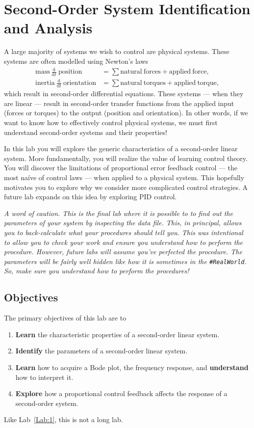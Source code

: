 \chapter{Second-Order System Identification and Analysis}\label{Lab:2}
A large majority of systems we wish to control are physical systems. These
systems are often modelled using Newton's laws
\[
\begin{aligned}
  \mathrm{mass}~\frac{\mathrm d}{\mathrm{d}t}~\mathrm{position}
    &= \sum \mathrm{natural~forces} + \mathrm{applied~force},\\
  \mathrm{inertia}~\frac{\mathrm d}{\mathrm{d}t}~\mathrm{orientation}
    &= \sum \mathrm{natural~torques} + \mathrm{applied~torque},
\end{aligned}
\]
which result in second-order differential equations. These systems --- when
they are linear --- result in second-order transfer functions from the
applied input (forces or torques) to the output (position and orientation).
In other words, if we want to know how to effectively control physical systems,
we must first understand second-order systems and their properties!

In this lab you will explore the generic characteristics of a second-order
linear system. More fundamentally, you will realize the value of learning
control theory. You will discover the limitations of proportional error
feedback control --- the most na\'ive of control laws --- when applied to
a physical system. This hopefully motivates you to explore why we consider
more complicated control strategies. A future lab expands on this
idea by exploring PID control.

\emph{A word of caution. This is the final lab where it is possible to
to find out the parameters of your system by inspecting the data file.
This, in principal, allows you to back-calculate what your procedures should
tell you. This was intentional to allow
you to check your work and ensure you understand how to perform the procedure.
However, future labs will assume you've perfected the procedure.
The parameters will be fairly well hidden like how it is sometimes in the
\texttt{\#RealWorld}. So, make sure you understand how to perform the
procedures!}

\section{Objectives}
The primary objectives of this lab are to
\begin{enumerate}[label=(\arabic*)]
  \item{
    \textbf{Learn} the characteristic properties of a second-order linear
    system.
  }
  \item{
    \textbf{Identify} the parameters of a second-order linear system.
  }
  \item{
    \textbf{Learn} how to acquire a Bode plot, the frequency response,
    and \textbf{understand} how to interpret it.
  }
  \item{
    \textbf{Explore} how a proportional control feedback affects the response
    of a second-order system.
  }
\end{enumerate}
Like Lab~\ref{Lab:1}, this is not a long lab.

